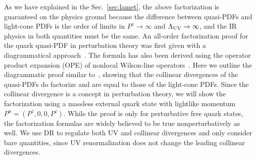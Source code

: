 \documentclass[aps,rmp,reprint,amsmath,amssymb,graphicx,longbibliography]{revtex4-1} %
\DeclareRobustCommand{\sec}[1]{Sec.~\ref{sec:#1}}
\begin{document}
As we have explained in the \sec{lamet}, the above factorization is guaranteed on the physics ground because
the difference between quasi-PDFs and light-cone PDFs is the order of limits in $P^z\to \infty$ and $\Lambda_{\rm UV}\to \infty$, and the IR physics in both quantities must be the same. An all-order
factorization proof for the quark quasi-PDF in perturbation theory was first given with a diagrammatical approach~\cite{Ma:2014jla}. The formula has also been derived using the operator product expansion (OPE) of nonlocal Wilson-line operators~\cite{Izubuchi:2018srq,Ma:2017pxb,Wang:2019tgg}.
Here we outline the diagrammatic proof similar to~\cite{Ma:2014jla}, showing
that the collinear divergences of the quasi-PDFs do factorize and
are equal to those of the light-cone PDFs.
Since the collinear divergence is a concept
in perturbation theory, we will show the factorization using a massless external quark state with lightlike momentum $P^\mu=(P^z,0,0,P^z)$.  While the proof is only for perturbative free quark states,
the factorization formulas are widely believed to be true nonperturbatively as well.
We use DR to regulate both UV and collinear divergences and only consider bare quantities, since UV renormalization does not change the leading collinear divergences.
\end{document}
